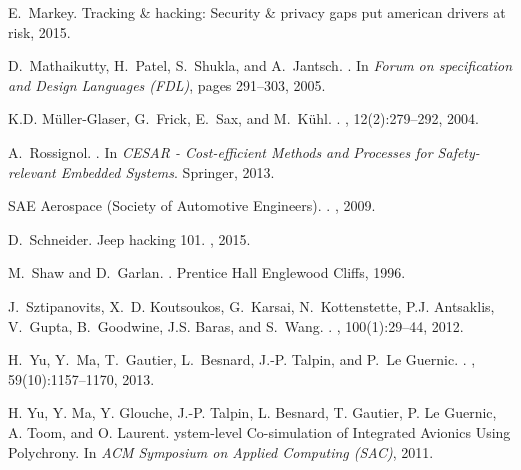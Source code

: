 \begin{thebibliography}{10}
E.~Markey.
\newblock Tracking \& hacking: Security \& privacy gaps put american drivers at
  risk, 2015.

D.~Mathaikutty, H.~Patel, S.~Shukla, and A.~Jantsch.
.
\newblock In {\em Forum on specification and Design Languages (FDL)}, pages
  291--303, 2005.

K.D. M\"uller-Glaser, G.~Frick, E.~Sax, and M.~K\"uhl.
.
,
  12(2):279--292, 2004.

A.~Rossignol.
.
\newblock In {\em CESAR - Cost-efficient Methods and Processes for
  Safety-relevant Embedded Systems}. Springer, 2013.

{SAE Aerospace (Society of Automotive Engineers)}.
.
, 2009.

D.~Schneider.
\newblock Jeep hacking 101.
, 2015.

M.~Shaw and D.~Garlan.
.
\newblock Prentice Hall Englewood Cliffs, 1996.

J.~Sztipanovits, X.~D. Koutsoukos, G.~Karsai, N.~Kottenstette, P.J. Antsaklis,
  V.~Gupta, B.~Goodwine, J.S. Baras, and S.~Wang.
.
, 100(1):29--44, 2012.

H.~Yu, Y.~Ma, T.~Gautier, L.~Besnard, J.-P. Talpin, and P.~{Le Guernic}.
.
, 59(10):1157--1170, 2013.

{H.} {Y}u, {Y.} {M}a, {Y.} {G}louche, {J.}-{P.} {T}alpin, {L.} {B}esnard, {T.}
  {G}autier, {P.} {L}e {G}uernic, {A.} {T}oom, and {O.} {L}aurent.
ystem-level {C}o-simulation of {I}ntegrated {A}vionics {U}sing
  {P}olychrony.
\newblock In {\em ACM Symposium on Applied Computing (SAC)}, 2011.

\end{thebibliography}
